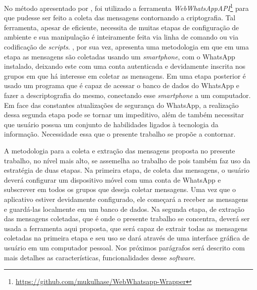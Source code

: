 No método apresentado por , foi utilizado a ferramenta \textit{WebWhatsAppAPI}\footnote{\href{https://github.com/mukulhase/WebWhatsapp-Wrapper}{https://github.com/mukulhase/WebWhatsapp-Wrapper}} para que pudesse ser feito a coleta das mensagens contornando a criptografia. Tal ferramenta, apesar de eficiente, necessita de muitas etapas de configuração de ambiente e sua manipulação é inteiramente feita via linha de comando ou via codificação de \textit{scripts}. , por sua vez, apresenta uma metodologia em que em uma etapa as mensagens são coletadas usando um \textit{smartphone}, com o WhatsApp instalado, deixando este com uma conta autenticada e devidamente inscrita nos grupos em que há interesse em coletar as mensagens. Em uma etapa posterior é usado um programa que é capaz de acessar o banco de dados do WhatsApp e fazer a descriptografia do mesmo, conectando esse \textit{smartphone} a um computador. Em face das constantes atualizações de segurança do WhatsApp, a realização dessa segunda etapa pode se tornar um impeditivo, além de também necessitar que usuário possua um conjunto de habilidades ligados à tecnologia da informação. Necessidade essa que o presente trabalho se propõe a contornar.

A metodologia para a coleta e extração das mensagens proposta no presente trabalho, no nível mais alto, se assemelha ao trabalho de  pois também faz uso da estratégia de duas etapas. Na primeira etapa, de coleta das mensagens, o usuário deverá configurar um dispositivo móvel com uma conta de WhatsApp e subscrever em todos os grupos que deseja coletar mensagens. Uma vez que o aplicativo estiver devidamente configurado, ele começará a receber as mensagens e guardá-las localmente em um banco de dados. Na segunda etapa, de extração das mensagens coletadas, que é onde o presente trabalho se concentra, deverá ser usada a ferramenta aqui proposta, que será capaz de extrair todas as mensagens coletadas na primeira etapa e seu uso se dará através de uma interface gráfica de usuário em um computador pessoal. Nos próximos parágrafos será descrito com mais detalhes as características, funcionalidades desse \textit{software}.

